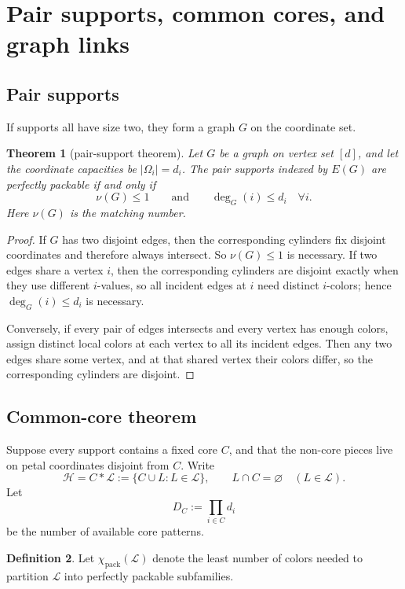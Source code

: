 \documentclass[11pt]{article}
\newtheorem{theorem}{Theorem}[section]
\theoremstyle{definition}
\newtheorem{definition}[theorem]{Definition}
\newcommand{\Chi}{\chi}
\newcommand{\pack}{\mathrm{pack}}
\newcommand{\Hh}{\mathcal H}
\newcommand{\Lk}{\mathcal L}
\begin{document}
\section{Pair supports, common cores, and graph links}
\subsection{Pair supports}
If supports all have size two, they form a graph \(G\) on the coordinate set.

\begin{theorem}[pair-support theorem]\label{thm:pair}
Let \(G\) be a graph on vertex set \([d]\), and let the coordinate capacities be \(|\Omega_i|=d_i\). The pair supports indexed by \(E(G)\) are perfectly packable if and only if
\[
\nu(G)\le 1
\qquad\text{and}\qquad
\deg_G(i)\le d_i\quad\forall i.
\]
Here \(\nu(G)\) is the matching number.
\end{theorem}

\begin{proof}
If \(G\) has two disjoint edges, then the corresponding cylinders fix disjoint coordinates and therefore always intersect. So \(\nu(G)\le 1\) is necessary. If two edges share a vertex \(i\), then the corresponding cylinders are disjoint exactly when they use different \(i\)-values, so all incident edges at \(i\) need distinct \(i\)-colors; hence \(\deg_G(i)\le d_i\) is necessary.

Conversely, if every pair of edges intersects and every vertex has enough colors, assign distinct local colors at each vertex to all its incident edges. Then any two edges share some vertex, and at that shared vertex their colors differ, so the corresponding cylinders are disjoint.
\end{proof}

\subsection{Common-core theorem}
Suppose every support contains a fixed core \(C\), and that the non-core pieces live on petal coordinates disjoint from \(C\). Write
\[
\Hh=C*\Lk:=\{C\cup L:L\in \Lk\},
\qquad
L\cap C=\varnothing\quad (L\in\Lk).
\]
Let
\[
D_C:=\prod_{i\in C} d_i
\]
be the number of available core patterns.

\begin{definition}
Let \(\Chi_{\pack}(\Lk)\) denote the least number of colors needed to partition \(\Lk\) into perfectly packable subfamilies.
\end{definition}
\end{document}
